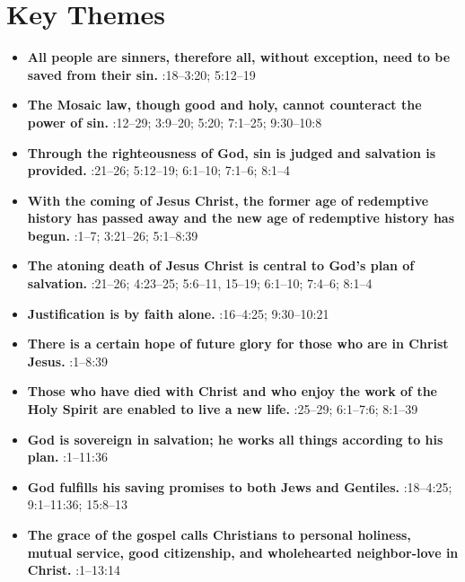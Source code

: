 \documentclass{article}
\begin{document}
\section*{Key Themes}

\begin{itemize}
    \item \textbf{All people are sinners, therefore all, without exception, need to be saved from their sin.}
    :18–3:20; 5:12–19
    \item \textbf{The Mosaic law, though good and holy, cannot counteract the power of sin.}
    :12–29; 3:9–20; 5:20; 7:1–25; 9:30–10:8
    \item \textbf{Through the righteousness of God, sin is judged and salvation is provided.}
    :21–26; 5:12–19; 6:1–10; 7:1–6; 8:1–4
    \item \textbf{With the coming of Jesus Christ, the former age of redemptive history has passed away and the new age of redemptive history has begun.}
    :1–7; 3:21–26; 5:1–8:39
    \item \textbf{The atoning death of Jesus Christ is central to God’s plan of salvation.}
    :21–26; 4:23–25; 5:6–11, 15–19; 6:1–10; 7:4–6; 8:1–4
    \item \textbf{Justification is by faith alone.}
    :16–4:25; 9:30–10:21
    \item \textbf{There is a certain hope of future glory for those who are in Christ Jesus.}
    :1–8:39
    \item \textbf{Those who have died with Christ and who enjoy the work of the Holy Spirit are enabled to live a new life.}
    :25–29; 6:1–7:6; 8:1–39
    \item \textbf{God is sovereign in salvation; he works all things according to his plan.}
    :1–11:36
    \item \textbf{God fulfills his saving promises to both Jews and Gentiles.}
    :18–4:25; 9:1–11:36; 15:8–13
    \item \textbf{The grace of the gospel calls Christians to personal holiness, mutual service, good citizenship, and wholehearted neighbor-love in Christ.}
    :1–13:14
\end{itemize}
\end{document}
